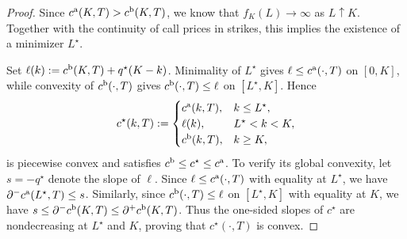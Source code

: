 \documentclass[11pt]{article}
\theoremstyle{plain}
\theoremstyle{definition}
\theoremstyle{remark}
\theoremstyle{plain}
\begin{document}
\begin{proof}
Since $c^{\rm a}(K,T)>c^{\rm b}(K,T)$, we know that $f_K(L)\to\infty$ as
$L\uparrow K$. Together with the continuity of call prices in strikes, this implies the existence of a minimizer $L^\star$. 

Set
$\ell(k):=c^{\rm b}(K,T)+q^\star(K-k)$. Minimality of $L^\star$ gives
$\ell\le c^{\rm a}(\cdot,T)$ on $[0,K]$, while convexity of
$c^{\rm b}(\cdot,T)$ gives $c^{\rm b}(\cdot,T)\le\ell$ on
$[L^\star,K]$. Hence
\[
c^\star(k,T):=
\begin{cases}
c^{\rm a}(k,T),&k\le L^\star,\\
\ell(k),&L^\star<k<K,\\
c^{\rm b}(k,T),&k\ge K,
\end{cases}
\]
is piecewise convex and satisfies
$c^{\rm b}\le c^\star\le c^{\rm a}$. To verify its global convexity, let $s=-q^\star$ denote the slope of
$\ell$. Since $\ell\le c^{\rm a}(\cdot,T)$ with equality at $L^\star$,
we have $\partial^-c^{\rm a}(L^\star,T)\le s$. Similarly, since
$c^{\rm b}(\cdot,T)\le\ell$ on $[L^\star,K]$ with equality at $K$, we
have $s\le\partial^-c^{\rm b}(K,T)\le\partial^+c^{\rm b}(K,T)$. Thus
the one-sided slopes of $c^\star$ are nondecreasing at $L^\star$ and
$K$, proving that $c^\star(\cdot,T)$ is convex.


\end{proof}
\end{document}
